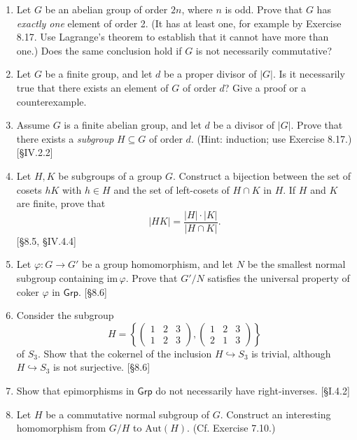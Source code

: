 \begin{enumerate}
      \item Let $G$ be an abelian group of order $2n$, where $n$ is odd. Prove that $G$ has \emph{exactly one} element of order 2. (It has at least one, for example by Exercise 8.17. Use Lagrange's theorem to establish that it cannot have more than one.) Does the same conclusion hold if $G$ is not necessarily commutative?

      \item Let $G$ be a finite group, and let $d$ be a proper divisor of $|G|$. Is it necessarily true that there exists an element of $G$ of order $d$? Give a proof or a counterexample.

      \item Assume $G$ is a finite abelian group, and let $d$ be a divisor of $|G|$. Prove that there exists a \emph{subgroup} $H \subseteq G$ of order $d$. (Hint: induction; use Exercise 8.17.) [\S IV.2.2]

      \item Let $H, K$ be subgroups of a group $G$. Construct a bijection between the set of cosets $hK$ with $h \in H$ and the set of left-cosets of $H \cap K$ in $H$. If $H$ and $K$ are finite, prove that
            \[ |HK| = \frac{|H| \cdot |K|}{|H \cap K|}. \]
            [\S8.5, \S IV.4.4]

      \item Let $\varphi: G \to G'$ be a group homomorphism, and let $N$ be the smallest normal subgroup containing $\text{im}\,\varphi$. Prove that $G'/N$ satisfies the universal property of coker $\varphi$ in $\mathsf{Grp}$. [\S8.6]

      \item Consider the subgroup
            \[ H = \left\{ \begin{pmatrix} 1 & 2 & 3 \\ 1 & 2 & 3 \end{pmatrix}, \begin{pmatrix} 1 & 2 & 3 \\ 2 & 1 & 3 \end{pmatrix} \right\} \]
            of $S_3$. Show that the cokernel of the inclusion $H \hookrightarrow S_3$ is trivial, although $H \hookrightarrow S_3$ is not surjective. [\S8.6]

      \item Show that epimorphisms in $\mathsf{Grp}$ do not necessarily have right-inverses. [\S I.4.2]

      \item Let $H$ be a commutative normal subgroup of $G$. Construct an interesting homomorphism from $G/H$ to $\text{Aut}(H)$. (Cf. Exercise 7.10.)
\end{enumerate}